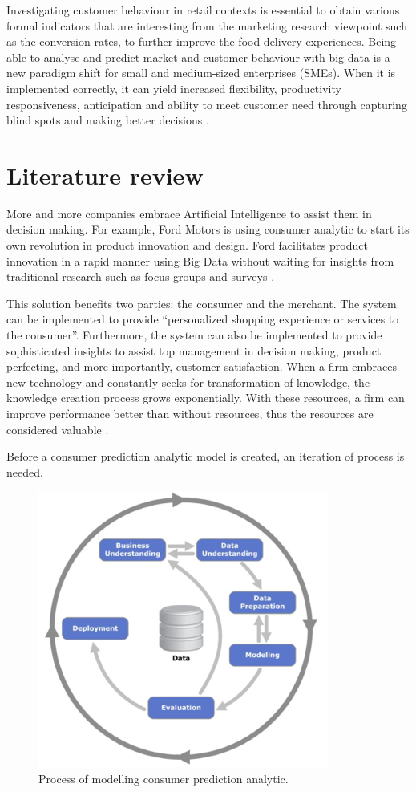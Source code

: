 \documentclass[journal]{IEEEtran}
\begin{document}
	Investigating customer behaviour in retail contexts is essential to obtain various formal indicators that are interesting from the marketing research viewpoint such as the conversion rates, to further improve the food delivery experiences. Being able to analyse and predict market and customer behaviour with big data is a new paradigm shift for small and medium-sized enterprises (SMEs). When it is implemented correctly, it can yield increased flexibility, productivity responsiveness, anticipation and ability to meet customer need through capturing blind spots and making better decisions \cite{Sen2016-mw}.
		
	\section{Literature review}
	More and more companies embrace Artificial Intelligence to assist them in decision making. For example, Ford Motors is using consumer analytic to start its own revolution in product innovation and design\cite{Erevelles2016-oa}. Ford facilitates product innovation in a rapid manner using Big Data without waiting for insights from traditional research such as focus groups and surveys \cite{Satell2014-mg}.
	
	This solution benefits two parties: the consumer and the merchant. The system can be implemented to provide “personalized shopping experience or services to the consumer”. Furthermore, the system can also be implemented to provide sophisticated insights to assist top management in decision making, product perfecting, and more importantly, customer satisfaction. When a firm embraces new technology and constantly seeks for transformation of knowledge, the knowledge creation process grows exponentially. With these resources, a firm can improve performance better than without resources, thus the resources are considered valuable \cite{Kozlenkova2014-yc}.
	
	Before a consumer prediction analytic model is created, an iteration of process is needed.
	
	\begin{figure}[!ht]
		\centering
		\includegraphics[scale=0.5]{process}
		\caption{Process of modelling consumer prediction analytic.}
	\end{figure}
\end{document}
